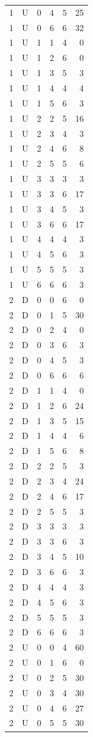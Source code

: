 \documentclass[11pt]{article}
\begin{document}
\begin{longtable}{cccccr}
1&U&0&4&5&25\\
1&U&0&6&6&32\\
1&U&1&1&4&0\\
1&U&1&2&6&0\\
1&U&1&3&5&3\\
1&U&1&4&4&4\\
1&U&1&5&6&3\\
1&U&2&2&5&16\\
1&U&2&3&4&3\\
1&U&2&4&6&8\\
1&U&2&5&5&6\\
1&U&3&3&3&3\\
1&U&3&3&6&17\\
1&U&3&4&5&3\\
1&U&3&6&6&17\\
1&U&4&4&4&3\\
1&U&4&5&6&3\\
1&U&5&5&5&3\\
1&U&6&6&6&3\\
2&D&0&0&6&0\\
2&D&0&1&5&30\\
2&D&0&2&4&0\\
2&D&0&3&6&3\\
2&D&0&4&5&3\\
2&D&0&6&6&6\\
2&D&1&1&4&0\\
2&D&1&2&6&24\\
2&D&1&3&5&15\\
2&D&1&4&4&6\\
2&D&1&5&6&8\\
2&D&2&2&5&3\\
2&D&2&3&4&24\\
2&D&2&4&6&17\\
2&D&2&5&5&3\\
2&D&3&3&3&3\\
2&D&3&3&6&3\\
2&D&3&4&5&10\\
2&D&3&6&6&3\\
2&D&4&4&4&3\\
2&D&4&5&6&3\\
2&D&5&5&5&3\\
2&D&6&6&6&3\\
2&U&0&0&4&60\\
2&U&0&1&6&0\\
2&U&0&2&5&30\\
2&U&0&3&4&30\\
2&U&0&4&6&27\\
2&U&0&5&5&30\\

\end{longtable}
\end{document}
